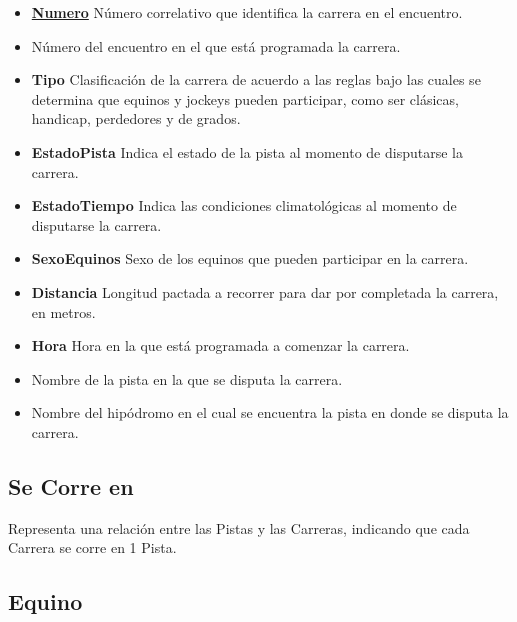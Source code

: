 \documentclass[a4paper,11pt]{article}
\begin{document}
\begin{itemize}

  \item \textbf{\uline{Numero}} Número correlativo que identifica la carrera en
    el encuentro.

  \item \textbf{\uline{}} Número del encuentro en el que está
    programada la carrera.

  \item \textbf{Tipo} Clasificación de la carrera de acuerdo a las reglas bajo
    las cuales se determina que equinos y jockeys pueden participar, como ser
    clásicas, handicap, perdedores y de grados.

  \item \textbf{EstadoPista} Indica el estado de la pista al momento de
    disputarse la carrera.

  \item \textbf{EstadoTiempo} Indica las condiciones climatológicas al momento
    de disputarse la carrera.

  \item \textbf{SexoEquinos} Sexo de los equinos que pueden participar en la
    carrera.

  \item \textbf{Distancia} Longitud pactada a recorrer para dar por completada
    la carrera, en metros.

  \item \textbf{Hora} Hora en la que está programada a comenzar la carrera.

  \item \textbf{} Nombre de la pista en la que se disputa la
    carrera.

  \item \textbf{} Nombre del hipódromo en el cual se
    encuentra la pista en donde se disputa la carrera.

\end{itemize}

\subsection{Se Corre en}

Representa una relación entre las Pistas y las Carreras, indicando que cada
Carrera se corre en 1 Pista.

\subsection{Equino}
\end{document}
